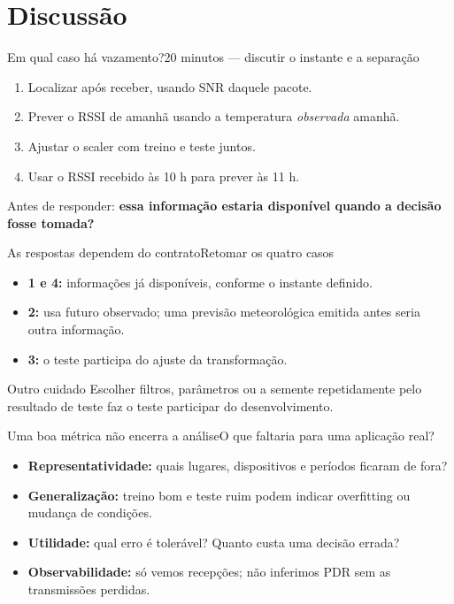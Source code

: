 \section{Discussão}
\begin{frame}{Em qual caso há vazamento?}{20 minutos — discutir o instante e a separação}
\begin{enumerate}
\item Localizar após receber, usando SNR daquele pacote.
\item Prever o RSSI de amanhã usando a temperatura \emph{observada} amanhã.
\item Ajustar o scaler com treino e teste juntos.
\item Usar o RSSI recebido às 10 h para prever às 11 h.
\end{enumerate}
\vspace{4mm}
Antes de responder: \textbf{essa informação estaria disponível quando a decisão fosse tomada?}
\end{frame}

\begin{frame}{As respostas dependem do contrato}{Retomar os quatro casos}
\begin{itemize}
\item \textbf{1 e 4:} informações já disponíveis, conforme o instante definido.
\item \textbf{2:} usa futuro observado; uma previsão meteorológica emitida antes seria outra informação.
\item \textbf{3:} o teste participa do ajuste da transformação.
\end{itemize}
\begin{block}{Outro cuidado}
Escolher filtros, parâmetros ou a semente repetidamente pelo resultado de teste
faz o teste participar do desenvolvimento.
\end{block}
\end{frame}

\begin{frame}{Uma boa métrica não encerra a análise}{O que faltaria para uma aplicação real?}
\begin{itemize}
\item \textbf{Representatividade:} quais lugares, dispositivos e períodos ficaram de fora?
\item \textbf{Generalização:} treino bom e teste ruim podem indicar overfitting ou mudança de condições.
\item \textbf{Utilidade:} qual erro é tolerável? Quanto custa uma decisão errada?
\item \textbf{Observabilidade:} só vemos recepções; não inferimos PDR sem as transmissões perdidas.
\end{itemize}
\end{frame}

